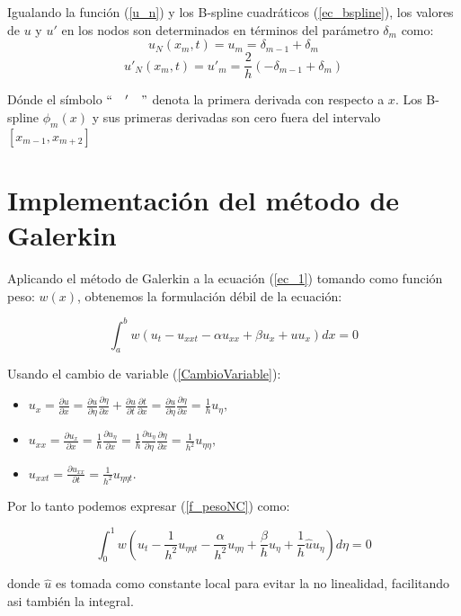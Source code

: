 Igualando la función (\ref{u_n}) y los B-spline cuadráticos (\ref{ec_bspline}), los valores de $u$ y $u'$ en los nodos son determinados en términos del parámetro $\delta_{m}$ como:
$$u_{N}(x_{m},t)=u_{m}=\delta_{m-1}+\delta_{m}$$
$$u'_{N}(x_{m},t)=u'_{m}=\frac{2}{h}(-\delta_{m-1}+\delta_{m})$$

Dónde el símbolo $``\quad ' \quad "$ denota la primera derivada con respecto a $x$. Los B-spline $\phi_{m}(x)$ y sus primeras derivadas son cero fuera del intervalo $[x_{m-1},x_{m+2}]$

\section{Implementación del método de Galerkin}

Aplicando el método de Galerkin a la ecuación (\ref{ec_1}) tomando como función peso: $w(x)$,  obtenemos la formulación débil de la ecuación:

\begin{equation}
\label{f_pesoNC}
    \int_{a}^{b} w(u_{t}-u_{xxt}-\alpha u_{xx} + \beta u_{x} +uu_{x}) dx =0
\end{equation}

Usando el cambio de variable (\ref{CambioVariable}):

\begin{itemize}
    \item $u_{x}=\frac{\partial u}{\partial x}=\frac{\partial u}{\partial \eta}\frac{\partial \eta}{\partial x}+\frac{\partial u}{\partial t}\frac{\partial t}{\partial x}=\frac{\partial u}{\partial \eta}\frac{\partial \eta}{\partial x}=\frac{1}{h}u_{\eta},$
    \item $u_{xx}=\frac{\partial u_{x}}{\partial x}=\frac{1}{h}\frac{\partial u_{\eta}}{\partial x}=\frac{1}{h}\frac{\partial u_{\eta}}{\partial \eta}\frac{\partial \eta}{\partial x}=\frac{1}{h^{2}}u_{\eta \eta},$
    \item $u_{xxt}=\frac{\partial u_{xx}}{\partial t}=\frac{1}{h^{2}}u_{\eta \eta t}.$
\end{itemize}

Por lo tanto podemos expresar (\ref{f_pesoNC}) como:

\begin{equation}
 \label{f_pesoCV}
    \int_{0}^{1}w(u_{t}-\frac{1}{h^{2}}u_{\eta \eta t}-\frac{\alpha}{h^{2}}u_{\eta \eta}+\frac{\beta}{h}u_{\eta}+\frac{1}{h}\widehat{u}u_{\eta}) d\eta =0
\end{equation}

donde $\widehat{u}$ es tomada como constante local para evitar la no linealidad, facilitando asi también la integral.


